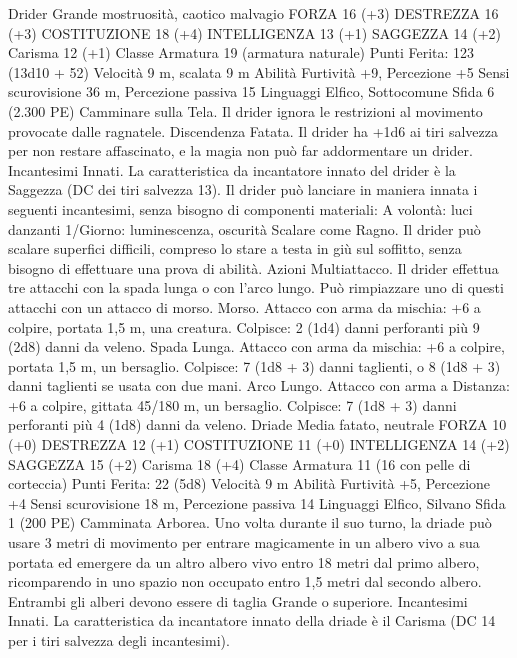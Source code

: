 \begin{multicols}{2}
Drider
Grande mostruosità, caotico malvagio
FORZA 16 (+3)
DESTREZZA 16 (+3)
COSTITUZIONE 18 (+4)
INTELLIGENZA 13 (+1)
SAGGEZZA 14 (+2)
Carisma 12 (+1)
Classe Armatura 19 (armatura naturale)
\hspace*{0pt}\hfill{Punti Ferita}: 123 (13d10 + 52)
Velocità 9 m, scalata 9 m
Abilità Furtività +9, Percezione +5
Sensi scurovisione 36 m, Percezione passiva 15
Linguaggi Elfico, Sottocomune
Sfida 6 (2.300 PE)
Camminare sulla Tela. Il drider ignora le restrizioni al
movimento provocate dalle ragnatele.
Discendenza Fatata. Il drider ha +1d6 ai tiri salvezza per
non restare affascinato, e la magia non può far addormentare un
drider.
Incantesimi Innati. La caratteristica da incantatore innato del
drider è la Saggezza (DC dei tiri salvezza 13). Il drider può
lanciare in maniera innata i seguenti incantesimi, senza bisogno
di componenti materiali:
A volontà: luci danzanti
1/Giorno: luminescenza, oscurità
Scalare come Ragno. Il drider può scalare superfici difficili,
compreso lo stare a testa in giù sul soffitto, senza bisogno di
effettuare una prova di abilità.
Azioni
Multiattacco. Il drider effettua tre attacchi con la spada lunga o
con l’arco lungo. Può rimpiazzare uno di questi attacchi con un
attacco di morso.
Morso. Attacco con arma da mischia: +6 a colpire, portata 1,5
m, una creatura.
Colpisce: 2 (1d4) danni perforanti più 9 (2d8) danni da veleno.
Spada Lunga. Attacco con arma da mischia: +6 a colpire,
portata 1,5 m, un bersaglio.
Colpisce: 7 (1d8 + 3) danni taglienti, o 8 (1d8 + 3) danni
taglienti se usata con due mani.
Arco Lungo. Attacco con arma a Distanza: +6 a colpire, gittata
45/180 m, un bersaglio.
Colpisce: 7 (1d8 + 3) danni perforanti più 4 (1d8) danni da
veleno.
Driade
Media fatato, neutrale
FORZA 10 (+0)
DESTREZZA 12 (+1)
COSTITUZIONE 11 (+0)
INTELLIGENZA 14 (+2)
SAGGEZZA 15 (+2)
Carisma 18 (+4)
Classe Armatura 11 (16 con pelle di corteccia)
\hspace*{0pt}\hfill{Punti Ferita}: 22 (5d8)
Velocità 9 m
Abilità Furtività +5, Percezione +4
Sensi scurovisione 18 m, Percezione passiva 14
Linguaggi Elfico, Silvano
Sfida 1 (200 PE)
Camminata Arborea. Uno volta durante il suo turno, la driade
può usare 3 metri di movimento per entrare magicamente in un
albero vivo a sua portata ed emergere da un altro albero vivo
entro 18 metri dal primo albero, ricomparendo in uno spazio non
occupato entro 1,5 metri dal secondo albero. Entrambi gli alberi
devono essere di taglia Grande o superiore.
Incantesimi Innati. La caratteristica da incantatore innato della
driade è il Carisma (DC 14 per i tiri salvezza degli incantesimi).

\end{multicols}
